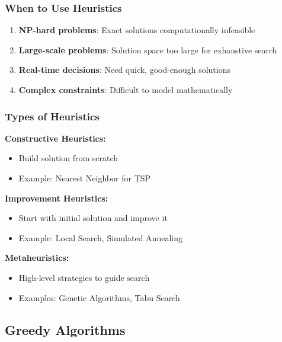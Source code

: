 \documentclass[
  letterpaper,
  DIV=11,
  numbers=noendperiod]{scrreprt}
\providecommand{\tightlist}{%
  \setlength{\itemsep}{0pt}\setlength{\parskip}{0pt}}
\begin{document}
\subsubsection{When to Use Heuristics}\label{when-to-use-heuristics}

\begin{enumerate}
\def\labelenumi{\arabic{enumi}.}
\tightlist
\item
  \textbf{NP-hard problems}: Exact solutions computationally infeasible
\item
  \textbf{Large-scale problems}: Solution space too large for exhaustive
  search
\item
  \textbf{Real-time decisions}: Need quick, good-enough solutions
\item
  \textbf{Complex constraints}: Difficult to model mathematically
\end{enumerate}

\subsubsection{Types of Heuristics}\label{types-of-heuristics}

\textbf{Constructive Heuristics:}

\begin{itemize}
\tightlist
\item
  Build solution from scratch
\item
  Example: Nearest Neighbor for TSP
\end{itemize}

\textbf{Improvement Heuristics:}

\begin{itemize}
\tightlist
\item
  Start with initial solution and improve it
\item
  Example: Local Search, Simulated Annealing
\end{itemize}

\textbf{Metaheuristics:}

\begin{itemize}
\tightlist
\item
  High-level strategies to guide search
\item
  Examples: Genetic Algorithms, Tabu Search
\end{itemize}

\subsection{Greedy Algorithms}\label{greedy-algorithms}
\end{document}
